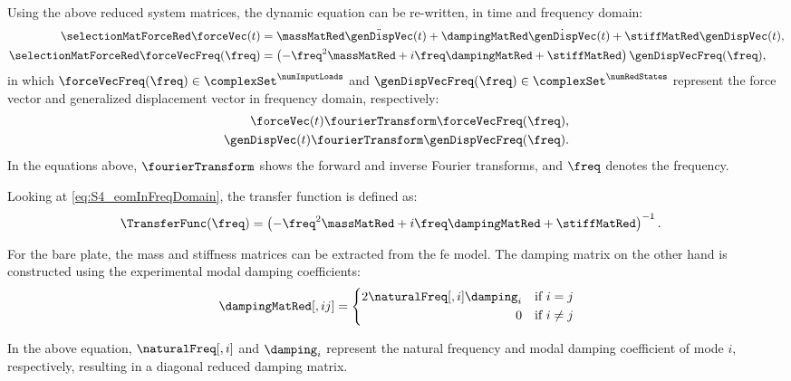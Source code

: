 Using the above reduced system matrices, the dynamic equation can be re-written, in time and frequency domain:
\begin{align}
    \selectionMatForceRed \forceVec (t)         & = \massMatRed \ddot{\genDispVec}(t) + \dampingMatRed \dot{\genDispVec}(t) + \stiffMatRed \genDispVec (t), \\
    \selectionMatForceRed \forceVecFreq (\freq) & = \left( -\freq^2 \massMatRed + i \freq \dampingMatRed + \stiffMatRed \right) \genDispVecFreq (\freq),
    \label{eq:S4_eomInFreqDomain}
\end{align}
in which \(\forceVecFreq (\freq) \in \complexSet^{\numInputLoads}\) and \(\genDispVecFreq (\freq) \in \complexSet^{\numRedStates}\) represent the force vector and generalized displacement vector in frequency domain, respectively:
\begin{align}
    \forceVec (t) \fourierTransform \forceVecFreq (\freq), \\
    \genDispVec (t) \fourierTransform \genDispVecFreq (\freq).
\end{align}
In the equations above, \(\fourierTransform\) shows the forward and inverse Fourier transforms, and \(\freq\) denotes the frequency.

Looking at \cref{eq:S4_eomInFreqDomain}, the transfer function is defined as:
\begin{align}
    \TransferFunc (\freq) & = \left( -\freq^2 \massMatRed + i \freq \dampingMatRed + \stiffMatRed \right)^{-1}.
\end{align}

For the bare plate, the mass and stiffness matrices can be extracted from the \gls{fe} model. The damping matrix on the other hand is constructed using the experimental modal damping coefficients:
\begin{equation}
    \dampingMatRed[,ij]  =
    \left\{
    \begin{aligned}
        2 \naturalFreq[,i] \damping_{i} & \quad \text{if } i = j    \\
        0                               & \quad \text{if } i \neq j
    \end{aligned}
    \right.
\end{equation}


In the above equation, \(\naturalFreq[,i]\) and \(\damping_{i}\) represent the natural frequency and modal damping coefficient of mode \(i\), respectively, resulting in a diagonal reduced damping matrix. 

